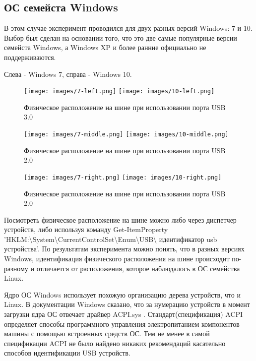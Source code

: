 \subsection{ОС семейста Windows}
В этом случае эксперимент проводился для двух разных версий Windows: 7 и 10. Выбор был сделан на основании того, что
это две самые популярные версии семейста Windows, а Windows XP и более ранние официально не поддерживаются.
\par
Слева - Windows 7, справа - Windows 10.
\begin{figure}[H]
  \texttt{[image: images/7-left.png]}
  \texttt{[image: images/10-left.png]}
  \caption{Физическое расположение на шине при использовании порта USB 3.0}
\end{figure}
\begin{figure}[H]
  \texttt{[image: images/7-middle.png]}
  \texttt{[image: images/10-middle.png]}
  \caption{Физическое расположение на шине при использовании порта USB 2.0}
\end{figure}
\begin{figure}[H]
  \texttt{[image: images/7-right.png]}
  \texttt{[image: images/10-right.png]}
  \caption{Физическое расположение на шине при использовании порта USB 2.0}
\end{figure}
Посмотреть физическое расположение на шине можно либо через диспетчер устройств, либо используя команду
Get-ItemProperty 'HKLM:\textbackslash System\textbackslash CurrentControlSet\textbackslash Enum\textbackslash USB\textbackslash
идентификатор usb устройства'.
По результатам эксперимента можно понять, что в разных версиях Windows, идентификация физического расположения на шине происходит по-разному и
отличается от расположения, которое наблюдалось в ОС семейства Linux.
\par
Ядро ОС Windows использует похожую организацию дерева устройств, что и Linux. В документации Windows сказано, что за нумерацию устройств
в момент загрузки ядра ОС отвечает
драйвер ACPI.sys \cite{acpi}. Стандарт(спецификация) ACPI определяет способы программного управления электропитанием компонентов
машины с помощью встроенных средств ОС. Тем не менее в самой спецификации ACPI не было найдено никаких рекомендаций касательно
способов идентификации USB устройств.

\clearpage
